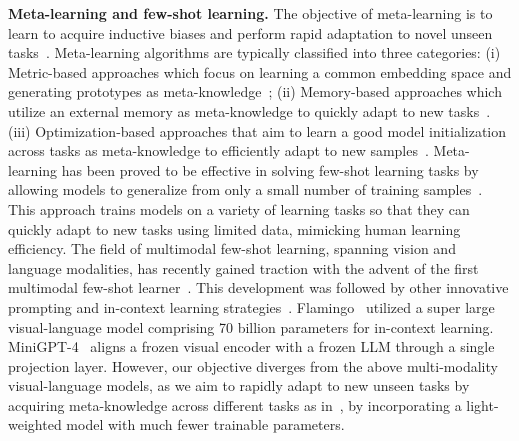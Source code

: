 \noindent \textbf{Meta-learning and few-shot learning.} 
The objective of meta-learning is to learn to acquire inductive biases and perform rapid adaptation to novel unseen tasks~\cite{grant2018recasting}. Meta-learning algorithms are typically classified into three categories: (i) Metric-based approaches which focus on learning a common embedding space and generating prototypes as meta-knowledge~\cite{vinyals2016matching,snell2017prototypical,sung2018learning}; (ii) Memory-based approaches which utilize an external memory as meta-knowledge to quickly adapt to new tasks~\cite{santoro2016meta,munkhdalai2017meta,munkhdalai2018rapid,mishra2018simple}. (iii) Optimization-based approaches that aim to learn a good model initialization across tasks as meta-knowledge to efficiently adapt to new samples~\cite{ravi2016optimization,finn2017model,grant2018recasting}. Meta-learning has been proved to be effective in solving few-shot learning tasks by allowing models to generalize from only a small number of training samples~\cite{elsken2020meta,huang20213d,lang2023base}. This approach trains models on a variety of learning tasks so that they can quickly adapt to new tasks using limited data, mimicking human learning efficiency. The field of multimodal few-shot learning, spanning vision and language modalities, has recently gained traction with the advent of the first multimodal few-shot learner~\cite{tsimpoukelli2021multimodal}. This development was followed by other innovative prompting and in-context learning strategies~\cite{jin2022good,song2022clip}. Flamingo~\cite{alayrac2022flamingo} utilized a super large visual-language model comprising 70 billion parameters for in-context learning. MiniGPT-4~\cite{zhu2023minigpt} aligns a frozen visual encoder with a frozen LLM through a single projection layer. However, our objective diverges from the above multi-modality visual-language models, as we aim to rapidly adapt to new unseen tasks by acquiring meta-knowledge across different tasks as in~\cite{najdenkoska2022meta}, by incorporating a light-weighted model with much fewer trainable parameters. 

